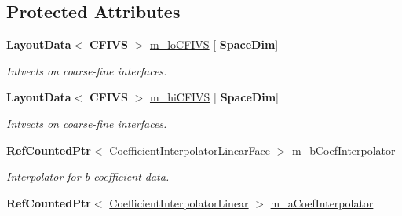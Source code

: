 \subsection*{Protected Attributes}
\begin{DoxyCompactItemize}
\item 
\mbox{\label{class_a_m_r_non_linear_multi_comp_op_a15ba0831b7d6ed8509954fcdedbc68b2}} 
\textbf{ Layout\+Data}$<$ \textbf{ C\+F\+I\+VS} $>$ \hyperlink{class_a_m_r_non_linear_multi_comp_op_a15ba0831b7d6ed8509954fcdedbc68b2}{m\+\_\+lo\+C\+F\+I\+VS} \mbox{[}\textbf{ Space\+Dim}\mbox{]}
\begin{DoxyCompactList}\small\item\em Intvects on coarse-\/fine interfaces. \end{DoxyCompactList}\item 
\mbox{\label{class_a_m_r_non_linear_multi_comp_op_ad98133545fea83f7ea83d97b571864ab}} 
\textbf{ Layout\+Data}$<$ \textbf{ C\+F\+I\+VS} $>$ \hyperlink{class_a_m_r_non_linear_multi_comp_op_ad98133545fea83f7ea83d97b571864ab}{m\+\_\+hi\+C\+F\+I\+VS} \mbox{[}\textbf{ Space\+Dim}\mbox{]}
\begin{DoxyCompactList}\small\item\em Intvects on coarse-\/fine interfaces. \end{DoxyCompactList}\item 
\mbox{\label{class_a_m_r_non_linear_multi_comp_op_a355e5cdcad525f983a8122bcf0ab09b4}} 
\textbf{ Ref\+Counted\+Ptr}$<$ \hyperlink{class_coefficient_interpolator_linear_face}{Coefficient\+Interpolator\+Linear\+Face} $>$ \hyperlink{class_a_m_r_non_linear_multi_comp_op_a355e5cdcad525f983a8122bcf0ab09b4}{m\+\_\+b\+Coef\+Interpolator}
\begin{DoxyCompactList}\small\item\em Interpolator for b coefficient data. \end{DoxyCompactList}\item 
\mbox{\label{class_a_m_r_non_linear_multi_comp_op_a725b0c0f13966b9b4ef303219a25fe7d}} 
\textbf{ Ref\+Counted\+Ptr}$<$ \hyperlink{class_coefficient_interpolator_linear}{Coefficient\+Interpolator\+Linear} $>$ \hyperlink{class_a_m_r_non_linear_multi_comp_op_a725b0c0f13966b9b4ef303219a25fe7d}{m\+\_\+a\+Coef\+Interpolator}

\end{DoxyCompactItemize}
